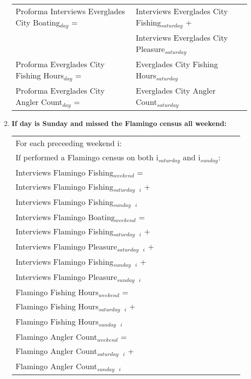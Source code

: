 \documentclass[letterpaper,12pt]{article}
\newcommand{\hspacer}{\hspace*{1cm}}
\begin{document}
\begin{enumerate}
\begin{tabular}{l@{ }l@{ }l}
	Proforma Interviews Everglades City Boating$_{day}$ =
		& Interviews Everglades City Fishing$_{saturday}$ $+$ \\
		& Interviews Everglades City Pleasure$_{saturday}$ \\

	Proforma Everglades City Fishing Hours$_{day}$ =
		& Everglades City Fishing Hours$_{saturday}$ \\

	Proforma Everglades City Angler Count$_{day}$ =
		& Everglades City Angler Count$_{saturday}$ \\
\end{tabular}

\item
\textbf{If day is Sunday and missed the Flamingo census all weekend:} \\
\begin{tabular}{l@{ }l@{ }l}
	For each preceeding weekend i: \\
\hspacer If performed a Flamingo census on both i$_{saturday}$ and i$_{sunday}$: \\
\hspacer \hspacer Interviews Flamingo Fishing$_{weekend}$ = \\
\hspacer \hspacer \hspacer Interviews Flamingo Fishing$_{saturday}$\ $_{i}$ $+$ \\
\hspacer \hspacer \hspacer Interviews Flamingo Fishing$_{sunday}$\ $_{i}$ \\

\hspacer \hspacer Interviews Flamingo Boating$_{weekend}$ = \\
\hspacer \hspacer \hspacer Interviews Flamingo Fishing$_{saturday}$\ $_{i}$ $+$ \\
\hspacer \hspacer \hspacer Interviews Flamingo Pleasure$_{saturday}$\ $_{i}$ $+$ \\
\hspacer \hspacer \hspacer Interviews Flamingo Fishing$_{sunday}$\ $_{i}$ $+$ \\
\hspacer \hspacer \hspacer Interviews Flamingo Pleasure$_{sunday}$\ $_{i}$ \\

\hspacer \hspacer Flamingo Fishing Hours$_{weekend}$ = \\
\hspacer \hspacer \hspacer Flamingo Fishing Hours$_{saturday}$\ $_{i}$ $+$ \\
\hspacer \hspacer \hspacer Flamingo Fishing Hours$_{sunday}$\ $_{i}$ \\

\hspacer \hspacer Flamingo Angler Count$_{weekend}$ = \\
\hspacer \hspacer \hspacer Flamingo Angler Count$_{saturday}$\ $_{i}$ $+$ \\
\hspacer \hspacer \hspacer Flamingo Angler Count$_{sunday}$\ $_{i}$ \\
\end{tabular}


\end{enumerate}
\end{document}
